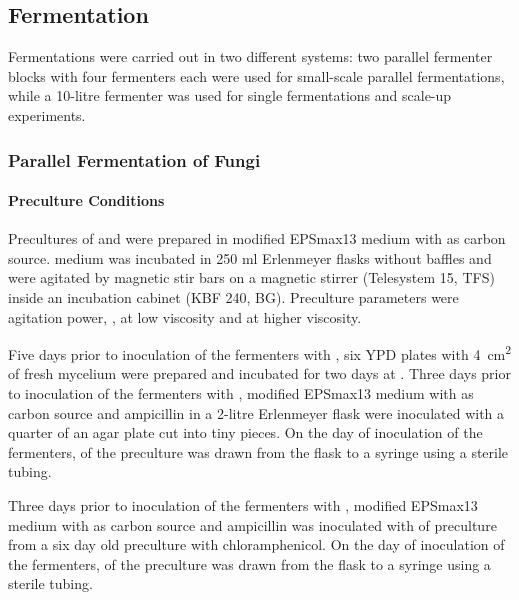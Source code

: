 \subsection{Fermentation\label{subsec-met-mibi-ferm}}
Fermentations were carried out in two different systems: two parallel fermenter blocks with four fermenters each were used for small-scale parallel fermentations, while a 10-litre fermenter was used for single fermentations and scale-up experiments.

\subsubsection{Parallel Fermentation of Fungi\label{subsubsec-met-mibi-ferm-fungi}}
\paragraph{Preculture Conditions}
Precultures of \longrolf{} and \longcomm{} were prepared in modified EPSmax13 medium with  \glc{} as carbon source.  medium was incubated in 250 ml Erlenmeyer flasks without baffles and were agitated by magnetic stir bars on a magnetic stirrer (Telesystem 15, TFS) inside an incubation cabinet (KBF 240, BG). Preculture parameters were  agitation power, ,  at low viscosity and  at higher viscosity.

Five days prior to inoculation of the fermenters with \rolf{}, six YPD plates with \SI{4}{\centi\metre\squared} of fresh mycelium were prepared and incubated for two days at . Three days prior to inoculation of the fermenters with \rolf{},  modified EPSmax13 medium with  \glc{} as carbon source and  ampicillin in a 2-litre Erlenmeyer flask were inoculated with a quarter of an agar plate cut into tiny pieces. On the day of inoculation of the fermenters,  of the preculture was drawn from the flask to a syringe using a sterile tubing.

Three days prior to inoculation of the fermenters with \comm{},  modified EPSmax13 medium with  \glc{} as carbon source and  ampicillin was inoculated with  of preculture from a six day old preculture with  chloramphenicol. On the day of inoculation of the fermenters,  of the preculture was drawn from the flask to a syringe using a sterile tubing.

